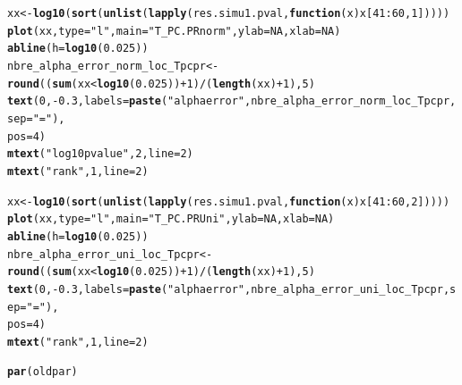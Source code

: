 \documentclass[12pt]{article}\usepackage[]{graphicx}\usepackage[]{color}
\makeatletter
\newcommand{\hlnum}[1]{\textcolor[rgb]{0.686,0.059,0.569}{#1}}%
\newcommand{\hlstr}[1]{\textcolor[rgb]{0.192,0.494,0.8}{#1}}%
\newcommand{\hlopt}[1]{\textcolor[rgb]{0,0,0}{#1}}%
\newcommand{\hlstd}[1]{\textcolor[rgb]{0.345,0.345,0.345}{#1}}%
\newcommand{\hlkwa}[1]{\textcolor[rgb]{0.161,0.373,0.58}{\textbf{#1}}}%
\newcommand{\hlkwb}[1]{\textcolor[rgb]{0.69,0.353,0.396}{#1}}%
\newcommand{\hlkwc}[1]{\textcolor[rgb]{0.333,0.667,0.333}{#1}}%
\newcommand{\hlkwd}[1]{\textcolor[rgb]{0.737,0.353,0.396}{\textbf{#1}}}%
\newenvironment{kframe}{%
 \def\at@end@of@kframe{}%
 \ifinner\ifhmode%
  \def\at@end@of@kframe{\end{minipage}}%
  \begin{minipage}{\columnwidth}%
 \fi\fi%
 \def\FrameCommand##1{\hskip\@totalleftmargin \hskip-\fboxsep
 \colorbox{shadecolor}{##1}\hskip-\fboxsep
     \hskip-\linewidth \hskip-\@totalleftmargin \hskip\columnwidth}%
 \MakeFramed {\advance\hsize-\width
   \@totalleftmargin\z@ \linewidth\hsize
   \@setminipage}}%
 {\par\unskip\endMakeFramed%
 \at@end@of@kframe}
\newenvironment{knitrout}{}{} %
\makeatother
\begin{document}
\begin{knitrout}
\begin{kframe}
\begin{alltt}
\hlstd{xx} \hlkwb{<-} \hlkwd{log10}\hlstd{(}\hlkwd{sort}\hlstd{(}\hlkwd{unlist}\hlstd{(}\hlkwd{lapply}\hlstd{(res.simu1.pval,} \hlkwa{function}\hlstd{(}\hlkwc{x}\hlstd{) x[}\hlnum{41}\hlopt{:}\hlnum{60}\hlstd{,} \hlnum{1}\hlstd{]))))}
\hlkwd{plot}\hlstd{(xx,} \hlkwc{type} \hlstd{=} \hlstr{"l"}\hlstd{,} \hlkwc{main} \hlstd{=} \hlstr{"T_PC.PR norm"}\hlstd{,} \hlkwc{ylab} \hlstd{=} \hlnum{NA}\hlstd{,} \hlkwc{xlab} \hlstd{=} \hlnum{NA}\hlstd{)}
\hlkwd{abline}\hlstd{(}\hlkwc{h} \hlstd{=} \hlkwd{log10}\hlstd{(}\hlnum{0.025}\hlstd{))}
\hlstd{nbre_alpha_error_norm_loc_Tpcpr} \hlkwb{<-} \hlkwd{round}\hlstd{((}\hlkwd{sum}\hlstd{(xx} \hlopt{<} \hlkwd{log10}\hlstd{(}\hlnum{0.025}\hlstd{))} \hlopt{+}\hlnum{1} \hlstd{)} \hlopt{/} \hlstd{(}\hlkwd{length}\hlstd{(xx)}\hlopt{+}\hlnum{1}\hlstd{),} \hlnum{5}\hlstd{)}
\hlkwd{text}\hlstd{(}\hlnum{0}\hlstd{,} \hlopt{-}\hlnum{0.3}\hlstd{,} \hlkwc{labels} \hlstd{=} \hlkwd{paste}\hlstd{(}\hlstr{"alpha error"}\hlstd{, nbre_alpha_error_norm_loc_Tpcpr,} \hlkwc{sep} \hlstd{=} \hlstr{" = "}\hlstd{),}
     \hlkwc{pos} \hlstd{=} \hlnum{4}\hlstd{)}
\hlkwd{mtext}\hlstd{(}\hlstr{"log10 pvalue"}\hlstd{,} \hlnum{2}\hlstd{,} \hlkwc{line} \hlstd{=} \hlnum{2}\hlstd{)}
\hlkwd{mtext}\hlstd{(}\hlstr{"rank"}\hlstd{,} \hlnum{1}\hlstd{,} \hlkwc{line} \hlstd{=} \hlnum{2}\hlstd{)}

\hlstd{xx} \hlkwb{<-} \hlkwd{log10}\hlstd{(}\hlkwd{sort}\hlstd{(}\hlkwd{unlist}\hlstd{(}\hlkwd{lapply}\hlstd{(res.simu1.pval,} \hlkwa{function}\hlstd{(}\hlkwc{x}\hlstd{) x[}\hlnum{41}\hlopt{:}\hlnum{60}\hlstd{,} \hlnum{2}\hlstd{]))))}
\hlkwd{plot}\hlstd{(xx,} \hlkwc{type} \hlstd{=} \hlstr{"l"}\hlstd{,} \hlkwc{main} \hlstd{=} \hlstr{"T_PC.PR Uni"}\hlstd{,} \hlkwc{ylab} \hlstd{=} \hlnum{NA}\hlstd{,} \hlkwc{xlab} \hlstd{=} \hlnum{NA}\hlstd{)}
\hlkwd{abline}\hlstd{(}\hlkwc{h} \hlstd{=} \hlkwd{log10}\hlstd{(}\hlnum{0.025}\hlstd{))}
\hlstd{nbre_alpha_error_uni_loc_Tpcpr} \hlkwb{<-} \hlkwd{round}\hlstd{((}\hlkwd{sum}\hlstd{(xx} \hlopt{<} \hlkwd{log10}\hlstd{(}\hlnum{0.025}\hlstd{))} \hlopt{+}\hlnum{1} \hlstd{)} \hlopt{/} \hlstd{(}\hlkwd{length}\hlstd{(xx)}\hlopt{+}\hlnum{1}\hlstd{),} \hlnum{5}\hlstd{)}
\hlkwd{text}\hlstd{(}\hlnum{0}\hlstd{,} \hlopt{-}\hlnum{0.3}\hlstd{,} \hlkwc{labels} \hlstd{=} \hlkwd{paste}\hlstd{(}\hlstr{"alpha error"}\hlstd{, nbre_alpha_error_uni_loc_Tpcpr,} \hlkwc{sep} \hlstd{=} \hlstr{" = "}\hlstd{),}
     \hlkwc{pos} \hlstd{=} \hlnum{4}\hlstd{)}
\hlkwd{mtext}\hlstd{(}\hlstr{"rank"}\hlstd{,} \hlnum{1}\hlstd{,} \hlkwc{line} \hlstd{=} \hlnum{2}\hlstd{)}

\hlkwd{par}\hlstd{(oldpar)}
\end{alltt}
\end{kframe}\begin{figure}


\end{figure}
\end{knitrout}
\end{document}
